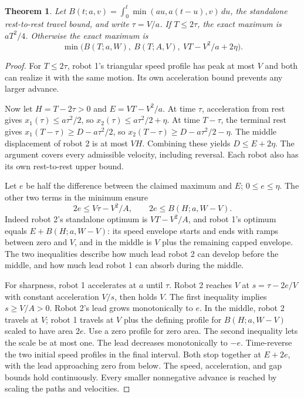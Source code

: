 \documentclass[11pt]{article}
\newtheorem{theorem}{Theorem}
\begin{document}
\begin{theorem}
Let \(B(t;a,v)=\int_0^t\min(a u,a(t-u),v)\,du\), the standalone
rest-to-rest travel bound, and write \(\tau=V/a\). If \(T\le2\tau\),
the exact maximum is \(aT^2/4\). Otherwise the exact maximum is
\[
 \min\bigl(B(T;a,W),\ B(T;A,V),\ VT-V^2/a+2\eta\bigr).
\]
\end{theorem}
\begin{proof}
For \(T\le2\tau\), robot 1's triangular speed profile has peak
at most \(V\) and both can realize it with the same motion. Its
own acceleration bound prevents any larger advance.

Now let \(H=T-2\tau>0\) and \(E=VT-V^2/a\). At time \(\tau\),
acceleration from rest gives \(x_1(\tau)\le a\tau^2/2\), so
\(x_2(\tau)\le a\tau^2/2+\eta\). At time \(T-\tau\), the
terminal rest gives \(x_1(T-\tau)\ge D-a\tau^2/2\), so
\(x_2(T-\tau)\ge D-a\tau^2/2-\eta\). The middle displacement of
robot 2 is at most \(VH\). Combining these yields \(D\le E+2\eta\).
The argument covers every admissible velocity, including reversal.
Each robot also has its own rest-to-rest upper bound.

Let \(e\) be half the difference between the claimed maximum
and \(E\); \(0\le e\le\eta\). The other two terms in the
minimum ensure
\[
        2e\le V\tau-V^2/A,\qquad
        2e\le B(H;a,W-V).
\]
Indeed robot 2's standalone optimum is \(VT-V^2/A\),
and robot 1's optimum equals \(E+B(H;a,W-V)\):
its speed envelope starts and ends with ramps between zero and
\(V\), and in the middle is \(V\) plus the remaining capped
envelope. The two inequalities describe how much lead robot 2
can develop before the middle, and how much lead robot 1 can
absorb during the middle.

For sharpness, robot 1 accelerates at \(a\) until \(\tau\).
Robot 2 reaches \(V\) at \(s=\tau-2e/V\) with constant
acceleration \(V/s\), then holds \(V\). The first inequality
implies \(s\ge V/A>0\). Robot 2's lead grows monotonically to
\(e\). In the middle, robot 2 travels at \(V\); robot 1 travels
at \(V\) plus the defining profile for \(B(H;a,W-V)\) scaled
to have area \(2e\). Use a zero profile for zero area. The
second inequality lets the scale be at most one. The lead
decreases monotonically to \(-e\). Time-reverse the two initial
speed profiles in the final interval. Both stop together at
\(E+2e\), with the lead approaching zero from below. The speed,
acceleration, and gap bounds hold continuously. Every smaller
nonnegative advance is reached by scaling the paths and velocities.
\end{proof}
\end{document}

